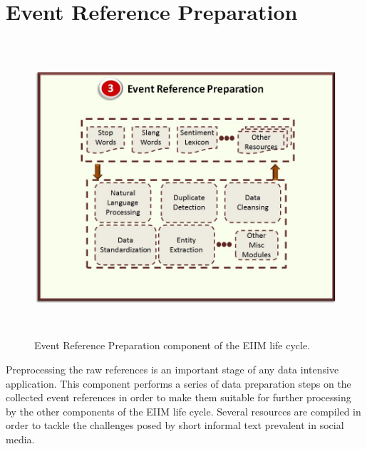 %
%
%
%
%

\section{Event Reference Preparation}

\begin{figure}[htbp]
  \caption{Event Reference Preparation component of the EIIM life cycle.}
  \centering
    \includegraphics[width=14cm,height=11cm]{Figures/EIIMComponents/EventReferencePreparation.jpg}
\end{figure}

Preprocessing the raw references is an important stage of any data intensive application. This component performs a series of data preparation steps on the collected event references in order to make them suitable for further processing by the other components of the EIIM life cycle. Several resources are compiled in order to tackle the challenges posed by short informal text prevalent in social media. 


